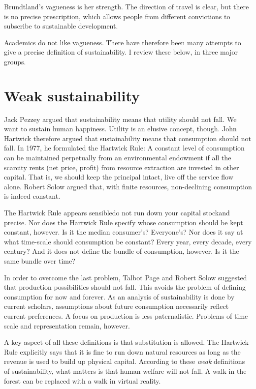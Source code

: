 Brundtland's vagueness is her strength. The direction of travel is clear, but there is no precise prescription, which allows people from different convictions to subscribe to sustainable development.

Academics do not like vagueness. There have therefore been many attempts to give a precise definition of sustainability. I review these below, in three major groups.

\section{Weak sustainability}
Jack Pezzey argued that sustainability means that utility should not fall. We want to sustain human happiness. Utility is an elusive concept, though. John Hartwick therefore argued that sustainability means that consumption should not fall. In 1977, he formulated the Hartwick Rule: A constant level of consumption can be maintained perpetually from an environmental endowment if all the scarcity rents (net price, profit) from resource extraction are invested in other capital. That is, we should keep the principal intact, live off the service flow alone. Robert Solow argued that, with finite resources, non-declining consumption is indeed constant.

The Hartwick Rule appears sensible\textemdash do not run down your capital stock\textemdash and precise. Nor does the Hartwick Rule specify whose consumption should be kept constant, however. Is it the median consumer's? Everyone's? Nor does it say at what time-scale should consumption be constant? Every year, every decade, every century? And it does not define the bundle of consumption, however. Is it the same bundle over time?

In order to overcome the last problem, Talbot Page and Robert Solow suggested that production possibilities should not fall. This avoids the problem of defining consumption for now and forever. As an analysis of sustainability is done by current scholars, assumptions about future consumption necessarily reflect current preferences. A focus on production is less paternalistic. Problems of time scale and representation remain, however.

A key aspect of all these definitions is that substitution is allowed. The Hartwick Rule explicitly says that it is fine to run down natural resources as long as the revenue is used to build up physical capital. According to these \emph{weak} definitions of sustainability, what matters is that human welfare will not fall. A walk in the forest can be replaced with a walk in virtual reality.


